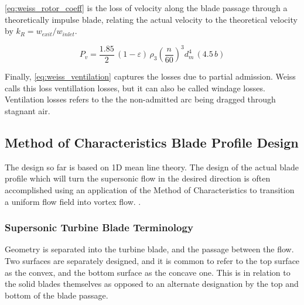 \cref{eq:weiss_rotor_coeff} is the loss of velocity along the blade passage through a theoretically impulse blade, relating the actual velocity to the theoretical velocity by $k_R=w_{exit}/w_{inlet}$.

\begin{equation}
    P_v = \frac{1.85}{2}\,(1 - \varepsilon)\,\rho_3 \left( \frac{n}{60} \right)^{3} d_m^4 \,(4.5\,b)
    \label{eq:weiss_ventilation}
\end{equation}

Finally, \cref{eq:weiss_ventilation} captures the losses due to partial admission. Weiss calls this loss ventillation losses, but it can also be called windage losses. Ventilation losses refers to the the non-admitted arc being dragged through stagnant air.



\subsection{Method of Characteristics Blade Profile Design}
\label{subsec:method_of_characteristics}

The design so far is based on 1D mean line theory. The design of the actual blade profile which will turn the supersonic flow in the desired direction is often accomplished using an application of the Method of Characteristics to transition a uniform flow field into vortex flow. . 

\subsubsection{Supersonic Turbine Blade Terminology}

Geometry is separated into the turbine blade, and the passage between the flow. Two surfaces are separately designed, and it is common to refer to the top surface as the convex, and the bottom surface as the concave one. This is in relation to the solid blades themselves as opposed to an alternate designation by the top and bottom of the blade passage.

